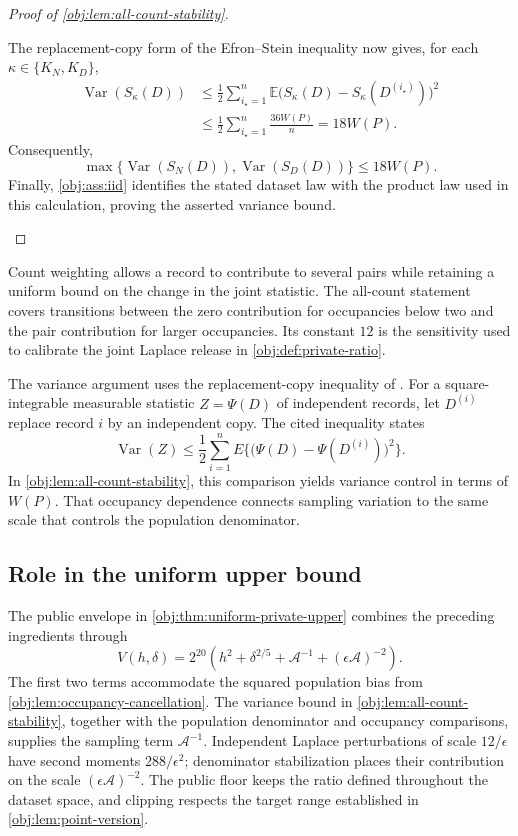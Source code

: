 \documentclass[11pt]{article}
\begin{document}
\begin{proof}[Proof of \cref{obj:lem:all-count-stability}]
\begin{enumerate}
The replacement-copy form of the Efron--Stein inequality
\citep[Theorem 3.1, p.~54]{BoucheronLugosiMassart2013}
now gives, for each \(\kappa\in\{K_N,K_D\}\),
\[
\begin{aligned}
\operatorname{Var}(S_\kappa(D))
&\le\frac12\sum_{i_\star=1}^n
\mathbb E\bigl(S_\kappa(D)-S_\kappa(D^{(i_\star)})\bigr)^2\\
&\le\frac12\sum_{i_\star=1}^n\frac{36W(P)}n
=18W(P).
\end{aligned}
\]
Consequently,
\[
\max\{\operatorname{Var}(S_N(D)),\operatorname{Var}(S_D(D))\}
\le18W(P).
\]
Finally, \cref{obj:ass:iid} identifies the stated dataset law with the product law used in this calculation, proving the asserted variance bound.
\end{enumerate}
\end{proof}

Count weighting allows a record to contribute to several pairs while retaining a uniform bound on the change in the joint statistic. The all-count statement covers transitions between the zero contribution for occupancies below two and the pair contribution for larger occupancies. Its constant \(12\) is the sensitivity used to calibrate the joint Laplace release in \cref{obj:def:private-ratio}.

The variance argument uses the replacement-copy inequality of \citet[Theorem 3.1, replacement-copy form, p.~54]{BoucheronLugosiMassart2013}. For a square-integrable measurable statistic \(Z=\Psi(D)\) of independent records, let \(D^{(i)}\) replace record \(i\) by an independent copy. The cited inequality states
\[
\operatorname{Var}(Z)
\le
\frac12\sum_{i=1}^n
E\bigl\{\bigl(\Psi(D)-\Psi(D^{(i)})\bigr)^2\bigr\}.
\]
In \cref{obj:lem:all-count-stability}, this comparison yields variance control in terms of \(W(P)\). That occupancy dependence connects sampling variation to the same scale that controls the population denominator.

\subsection{Role in the uniform upper bound}

The public envelope in \cref{obj:thm:uniform-private-upper} combines the preceding ingredients through
\[
V(h,\delta)
=
2^{20}\left(
h^2+\delta^{2/5}
+\mathcal A^{-1}
+(\epsilon\mathcal A)^{-2}
\right).
\]
The first two terms accommodate the squared population bias from \cref{obj:lem:occupancy-cancellation}. The variance bound in \cref{obj:lem:all-count-stability}, together with the population denominator and occupancy comparisons, supplies the sampling term \(\mathcal A^{-1}\). Independent Laplace perturbations of scale \(12/\epsilon\) have second moments \(288/\epsilon^2\); denominator stabilization places their contribution on the scale \((\epsilon\mathcal A)^{-2}\). The public floor keeps the ratio defined throughout the dataset space, and clipping respects the target range established in \cref{obj:lem:point-version}.
\end{document}
